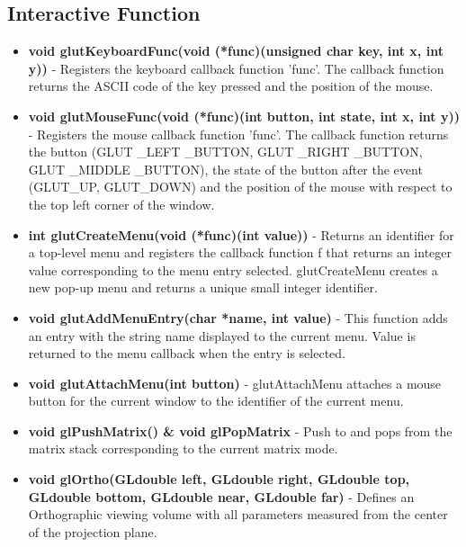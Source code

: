 \documentclass[fontsize=12pt]{article}
\begin{document}
\subsection{Interactive Function}
\begin{itemize}
\item \textbf{void glutKeyboardFunc(void (*func)(unsigned char key, int x, int y))}
- Registers the keyboard callback function 'func'. The callback function returns the ASCII code of the key pressed and the position of the mouse.
\end{itemize}
\begin{itemize}
\item \textbf{void glutMouseFunc(void (*func)(int button, int state, int x, int y))}
- Registers the mouse callback function 'func'. The callback function returns the button (GLUT \_LEFT \_BUTTON, GLUT \_RIGHT  \_BUTTON, GLUT \_MIDDLE \_BUTTON), the state of the button after the event (GLUT\_UP, GLUT\_DOWN) and the position of the mouse with respect to the top left corner of the window.
\end{itemize}
\begin{itemize}
\item \textbf{int glutCreateMenu(void (*func)(int value))}
- Returns an identifier for a top-level menu and registers the callback function f that returns an integer value corresponding to the menu entry selected. glutCreateMenu creates a new pop-up menu and returns a unique small integer identifier.
\end{itemize}
\begin{itemize}
\item \textbf{void glutAddMenuEntry(char *name, int value)}
- This function adds an entry with the string name displayed to the current menu. Value is returned to the menu callback when the entry is selected.
\end{itemize}
\begin{itemize}
\item \textbf{void glutAttachMenu(int button)}
- glutAttachMenu attaches a mouse button for the current window to the identifier of the current menu.
\end{itemize}
\begin{itemize}
\item \textbf{void glPushMatrix() \& void glPopMatrix}
- Push to and pops from the matrix stack corresponding to the current matrix mode.
\end{itemize}
\begin{itemize}
\item \textbf{void glOrtho(GLdouble left, GLdouble right, GLdouble top, GLdouble bottom, GLdouble near, GLdouble far)}
- Defines an Orthographic viewing volume with all parameters measured from the center of the projection plane.
\end{itemize}
\newpage
\end{document}
